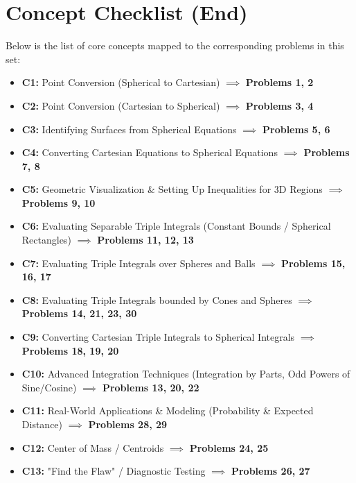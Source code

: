 \documentclass[11pt]{article}
\begin{document}
\section*{Concept Checklist (End)}
Below is the list of core concepts mapped to the corresponding problems in this set:
\begin{itemize}
    \item \textbf{C1:} Point Conversion (Spherical to Cartesian) $\implies$ \textbf{Problems 1, 2}
    \item \textbf{C2:} Point Conversion (Cartesian to Spherical) $\implies$ \textbf{Problems 3, 4}
    \item \textbf{C3:} Identifying Surfaces from Spherical Equations $\implies$ \textbf{Problems 5, 6}
    \item \textbf{C4:} Converting Cartesian Equations to Spherical Equations $\implies$ \textbf{Problems 7, 8}
    \item \textbf{C5:} Geometric Visualization \& Setting Up Inequalities for 3D Regions $\implies$ \textbf{Problems 9, 10}
    \item \textbf{C6:} Evaluating Separable Triple Integrals (Constant Bounds / Spherical Rectangles) $\implies$ \textbf{Problems 11, 12, 13}
    \item \textbf{C7:} Evaluating Triple Integrals over Spheres and Balls $\implies$ \textbf{Problems 15, 16, 17}
    \item \textbf{C8:} Evaluating Triple Integrals bounded by Cones and Spheres $\implies$ \textbf{Problems 14, 21, 23, 30}
    \item \textbf{C9:} Converting Cartesian Triple Integrals to Spherical Integrals $\implies$ \textbf{Problems 18, 19, 20}
    \item \textbf{C10:} Advanced Integration Techniques (Integration by Parts, Odd Powers of Sine/Cosine) $\implies$ \textbf{Problems 13, 20, 22}
    \item \textbf{C11:} Real-World Applications \& Modeling (Probability \& Expected Distance) $\implies$ \textbf{Problems 28, 29}
    \item \textbf{C12:} Center of Mass / Centroids $\implies$ \textbf{Problems 24, 25}
    \item \textbf{C13:} "Find the Flaw" / Diagnostic Testing $\implies$ \textbf{Problems 26, 27}
\end{itemize}
\end{document}
